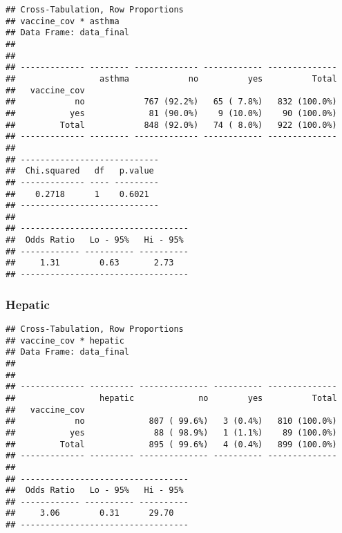 \documentclass[
]{article}
\newenvironment{Shaded}{\begin{snugshade}}{\end{snugshade}}
\newcommand{\AttributeTok}[1]{\textcolor[rgb]{0.77,0.63,0.00}{#1}}
\newcommand{\ConstantTok}[1]{\textcolor[rgb]{0.00,0.00,0.00}{#1}}
\newcommand{\FunctionTok}[1]{\textcolor[rgb]{0.00,0.00,0.00}{#1}}
\newcommand{\NormalTok}[1]{#1}
\newcommand{\SpecialCharTok}[1]{\textcolor[rgb]{0.00,0.00,0.00}{#1}}
\newcommand{\StringTok}[1]{\textcolor[rgb]{0.31,0.60,0.02}{#1}}
\begin{document}
\begin{verbatim}
## Cross-Tabulation, Row Proportions  
## vaccine_cov * asthma  
## Data Frame: data_final  
## 
## 
## ------------- -------- ------------- ------------ --------------
##                 asthma            no          yes          Total
##   vaccine_cov                                                   
##            no            767 (92.2%)   65 ( 7.8%)   832 (100.0%)
##           yes             81 (90.0%)    9 (10.0%)    90 (100.0%)
##         Total            848 (92.0%)   74 ( 8.0%)   922 (100.0%)
## ------------- -------- ------------- ------------ --------------
## 
## ----------------------------
##  Chi.squared   df   p.value 
## ------------- ---- ---------
##    0.2718      1    0.6021  
## ----------------------------
## 
## ----------------------------------
##  Odds Ratio   Lo - 95%   Hi - 95% 
## ------------ ---------- ----------
##     1.31        0.63       2.73   
## ----------------------------------
\end{verbatim}

\hypertarget{hepatic}{%
\subsubsection{Hepatic}\label{hepatic}}

\begin{Shaded}
\end{Shaded}

\begin{verbatim}
## Cross-Tabulation, Row Proportions  
## vaccine_cov * hepatic  
## Data Frame: data_final  
## 
## 
## ------------- --------- -------------- ---------- --------------
##                 hepatic             no        yes          Total
##   vaccine_cov                                                   
##            no             807 ( 99.6%)   3 (0.4%)   810 (100.0%)
##           yes              88 ( 98.9%)   1 (1.1%)    89 (100.0%)
##         Total             895 ( 99.6%)   4 (0.4%)   899 (100.0%)
## ------------- --------- -------------- ---------- --------------
## 
## ----------------------------------
##  Odds Ratio   Lo - 95%   Hi - 95% 
## ------------ ---------- ----------
##     3.06        0.31      29.70   
## ----------------------------------
\end{verbatim}
\end{document}

